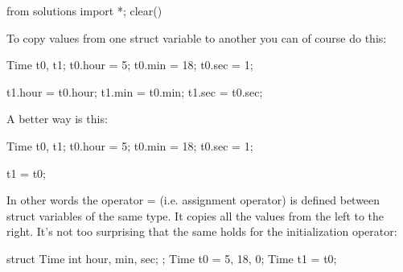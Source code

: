 \begin{python0}
from solutions import *; clear()
\end{python0}

To copy values from one struct variable to another you can of course do
this:

\begin{consolethree}[escapeinside=||]
Time t0, t1;
t0.hour = 5;
t0.min = 18;
t0.sec = 1;

t1.hour = t0.hour;
t1.min = t0.min;
t1.sec = t0.sec;
\end{consolethree}

A better way is this:

\begin{consolethree}[escapeinside=||]
Time t0, t1;
t0.hour = 5;
t0.min = 18;
t0.sec = 1;

t1 = t0;
\end{consolethree}

In other words the operator = (i.e. assignment operator) is defined
between struct variables of the same type. It copies all the values from
the left to the right. It's not too surprising that the same holds for the
initialization operator:

\begin{consolethree}[escapeinside=||]
struct Time
{
  int hour, min, sec;
};
Time t0 = {5, 18, 0};
Time t1 = t0;
\end{consolethree}





